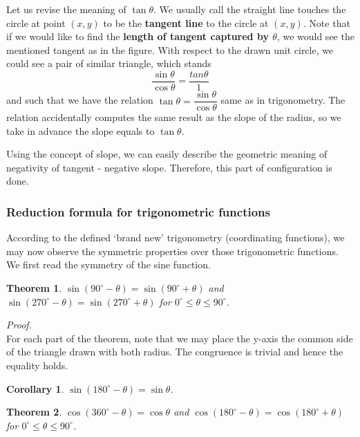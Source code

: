 \documentclass[12pt]{article}
\newtheorem*{theorem}{Theorem}
\newtheorem*{corollary}{Corollary}
\renewenvironment{proof}[1][Proof]{\begin{snugshade*} \textit{{#1}.}\\}{\hfill \qedsymbol \end{snugshade*}}
\begin{document}
    Let us revise the meaning of $\tan{\theta}$. We usually call the straight line touches the circle at point $(x,y)$ to be the \textbf{tangent line} to the circle at $(x,y)$. Note that if we would like to find the \textbf{length of tangent captured by $\theta$}, we would see the mentioned tangent as in the figure. With respect to the drawn unit circle, we could see a pair of similar triangle, which stands $$\frac{\sin{\theta}}{\cos{\theta}}=\frac{tan{\theta}}{1}$$ and such that we have the relation $\tan{\theta}=\dfrac{\sin{\theta}}{\cos{\theta}}$ same as in trigonometry. The relation accidentally computes the same result as the slope of the radius, so we take in advance the slope equals to $\tan{\theta}$.

    Using the concept of slope, we can easily describe the geometric meaning of negativity of tangent - negative slope. Therefore, this part of configuration is done.

    \subsubsection*{Reduction formula for trigonometric functions}

    According to the defined `brand new' trigonometry (coordinating functions), we may now observe the symmetric properties over those trigonometric functions. We first read the symmetry of the sine function.

    \begin{theorem}
        $\sin{(90^\circ - \theta)}=\sin{(90^\circ + \theta)}$ and $\sin{(270^\circ - \theta)}=\sin{(270^\circ + \theta)}$ for $0^\circ \leq \theta \leq 90^\circ$.
    \end{theorem}

    \begin{proof}
        For each part of the theorem, note that we may place the y-axis the common side of the triangle drawn with both radius. The congruence is trivial and hence the equality holds.
    \end{proof}

    \begin{corollary}
        $\sin{(180^\circ - \theta)}=\sin{\theta}$.
    \end{corollary}

    \begin{theorem}
        $\cos{(360^\circ - \theta)}=\cos{\theta}$ and $\cos{(180^\circ - \theta)}=\cos{(180^\circ + \theta)}$ for $0^\circ \leq \theta \leq 90^\circ$.
    \end{theorem}
\end{document}
